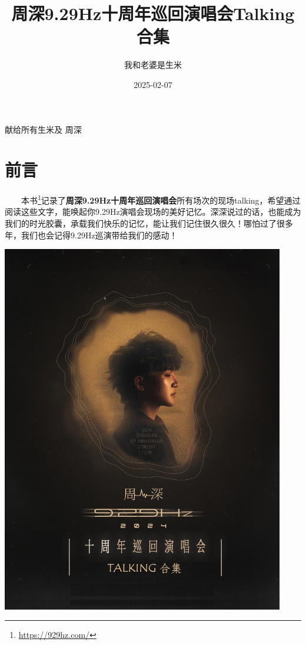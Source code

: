 \documentclass[]{ctexbook}
\title{周深9.29Hz十周年巡回演唱会Talking合集}
\author{我和老婆是生米}
\date{2025-02-07}
\renewcommand{\href}[2]{#2\footnote{\url{#1}}}
\begin{document}
\maketitle


\thispagestyle{empty}

\begin{center}
献给所有生米及
          周深
\end{center}

\setlength{\abovedisplayskip}{-5pt}
\setlength{\abovedisplayshortskip}{-5pt}

\mainmatter

{
\setcounter{tocdepth}{2}
\tableofcontents
}
\listoftables
\listoffigures
\chapter*{前言}\label{ux524dux8a00}


  \href{https://929hz.com/}{本书}记录了\textbf{周深9.29Hz十周年巡回演唱会}所有场次的现场talking，希望通过阅读这些文字，能唤起你9.29Hz演唱会现场的美好记忆。深深说过的话，也能成为我们的时光胶囊，承载我们快乐的记忆，能让我们记住很久很久！哪怕过了很多年，我们也会记得9.29Hz巡演带给我们的感动！

\begin{center}\includegraphics[width=350pt]{img/book-cover} \end{center}
\end{document}
